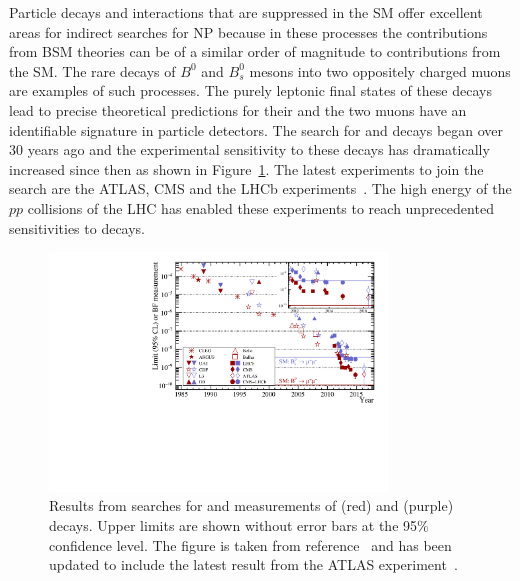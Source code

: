 Particle decays and interactions that are suppressed in the SM offer excellent areas for indirect searches for NP because in these processes the contributions from BSM theories can be of a similar order of magnitude to contributions from the SM. The rare decays of $B^{0}$ and $B^{0}_{s}$ mesons into two oppositely charged muons are examples of such processes. The purely leptonic final states of these decays lead to precise theoretical predictions for their \BFs and the two muons have an identifiable signature in particle detectors. The search for \bdmumu and \bsmumu decays began over 30 years ago and the experimental sensitivity to these decays has dramatically increased since then as shown in Figure~\ref{fig:bmumu_history}. The latest experiments to join the search are the ATLAS, CMS and the LHCb experiments~\cite{Aad:2012pn,Aaboud:2016ire, Chatrchyan:2011kr, Chatrchyan:2012rga, Chatrchyan:2013bka, Aaij:2011rja, LHCb:2011ac,Aaij:2012ac,Aaij:2012nna,Aaij:2013aka,CMS:2014xfa}. The high energy of the $pp$ collisions of the LHC has enabled these experiments to reach unprecedented sensitivities to \bmumu decays. 

\begin{figure}[tbp]
    \centering
        \includegraphics[width=0.8\textwidth]{./Figs/Introduction/95_CL.pdf}
    \caption{Results from searches for and measurements of \bdmumu (red) and \bsmumu (purple) decays. Upper limits are shown without error bars at the 95$\%$ confidence level. The figure is taken from reference~\cite{CMS:2014xfa} and has been updated to include the latest result from the ATLAS experiment~\cite{Aaboud:2016ire}.}
    \label{fig:bmumu_history}
\end{figure}

